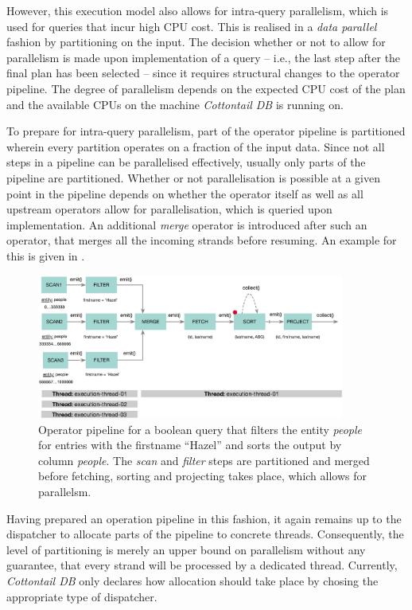 However, this execution model also allows for intra-query parallelism, which is used for queries that incur high CPU cost. This is realised in a \emph{data parallel} fashion by partitioning on the input. The decision whether or not to allow for parallelism is made upon implementation of a query -- i.e., the last step after the final plan has been selected -- since it requires structural changes to the operator pipeline. The degree of parallelism depends on the expected CPU cost of the plan and the available CPUs on the machine \emph{Cottontail DB} is running on.

To prepare for intra-query parallelism, part of the operator pipeline is partitioned wherein every partition operates on a fraction of the input data. Since not all steps in a pipeline can be parallelised effectively, usually only parts of the pipeline are partitioned. Whether or not parallelisation is possible at a given point in the pipeline depends on whether the operator itself as well as all upstream operators allow for parallelisation, which is queried upon implementation. An additional \emph{merge} operator is introduced after such an operator, that merges all the incoming strands before resuming. An example for this is given in .

\begin{figure}[bt]
    \centering
    \includegraphics[width=0.9\textwidth]{figures/execution-model-parallel}
    \caption{Operator pipeline for a boolean query that filters the entity \emph{people} for entries with the firstname ``Hazel'' and sorts the output by column \emph{people}. The \emph{scan} and \emph{filter} steps are partitioned and merged before fetching, sorting and projecting takes place, which allows for parallelsm.}
    \label{figure:cottontail_execution_model_parallel}
\end{figure}

Having prepared an operation pipeline in this fashion, it again remains up to the dispatcher to allocate parts of the pipeline to concrete threads. Consequently, the level of partitioning is merely an upper bound on parallelism without any guarantee, that every strand will be processed by a dedicated thread. Currently, \emph{Cottontail DB} only declares how allocation should take place by chosing the appropriate type of dispatcher.

